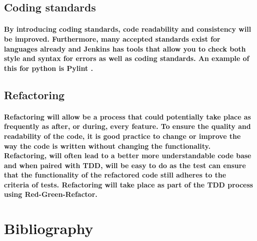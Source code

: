 \documentclass{article}
\begin{document}
\subsection{Coding standards}
\paragraph{By introducing coding standards, code readability and consistency will be improved. Furthermore, many accepted standards exist for languages already and Jenkins has tools that allow you to check both style and syntax for errors as well as coding standards. An example of this for python is Pylint \cite{pylint}.
}

\subsection{Refactoring}
\paragraph{Refactoring will allow be a process that could potentially take place as frequently as after, or during, every feature. To ensure the quality and readability of the code, it is good practice to change or improve the way the code is written without changing the functionality. Refactoring, will often lead to a better more understandable code base and when paired with TDD, will be easy to do as the test can ensure that the functionality of the refactored code still adheres to the criteria of tests. Refactoring will take place as part of the TDD process using Red-Green-Refactor.}


\nocite{*} %

\newpage


\section{Bibliography}
\end{document}
